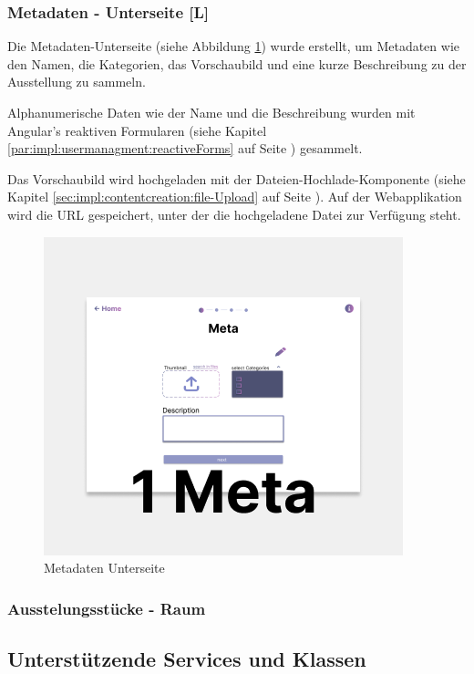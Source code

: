 \subsubsection{Metadaten - Unterseite [L]}
Die Metadaten-Unterseite (siehe Abbildung \ref{fig:impl:creation:Metadaten_Unterseite}) wurde erstellt, um Metadaten wie den Namen, die Kategorien, das Vorschaubild und eine kurze Beschreibung zu der Ausstellung zu sammeln.

Alphanumerische Daten wie der Name und die Beschreibung wurden mit Angular's reaktiven Formularen (siehe Kapitel \ref{par:impl:usermanagment:reactiveForms} auf Seite \pageref{par:impl:usermanagment:reactiveForms}) gesammelt.

Das Vorschaubild wird hochgeladen mit der Dateien-Hochlade-Komponente (siehe Kapitel \ref{sec:impl:contentcreation:file-Upload} auf Seite \pageref{sec:impl:contentcreation:file-Upload}). Auf der Webapplikation wird die URL gespeichert, unter der die hochgeladene Datei zur Verfügung steht.

\begin{figure}
    \centering
    \includegraphics[scale=0.5]{pics/metadaten.png}
    \caption{Metadaten Unterseite}
    \label{fig:impl:creation:Metadaten_Unterseite}
\end{figure}

\subsubsection{Ausstelungsstücke - Raum}
\subsection{Unterstützende Services und Klassen}
\label{sec::impl::contentcreation::UnterstuetzendeServicesUndKlassen}
